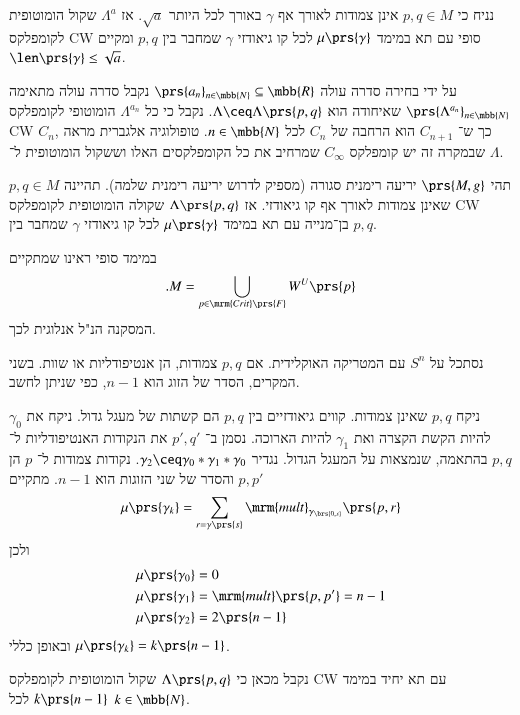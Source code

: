 \documentclass[a4paper,10pt,twoside,openany]{book}
\begin{document}
\begin{proposition}
נניח כי
$p,q \in M$
אינן צמודות לאורך אף
$\gamma$
באורך לכל היותר
$\sqrt{a}$.
אז
$\Lambda^a$
שקול הומוטופית לקומפלקס
\textenglish{CW}
סופי עם תא במימד
$\mu\prs{\gamma}$
לכל קו גיאודזי
$\gamma$
שמחבר בין
$p,q$
ומקיים
$\len\prs{\gamma} \leq \sqrt{a}$.
\end{proposition}

\begin{remark}
על ידי בחירה סדרה עולה
$\prs{a_n}_{n \in \mbb{N}} \subseteq \mbb{R}$
נקבל סדרה עולה מתאימה
$\prs{\Lambda^{a_n}}_{n \in \mbb{N}}$
שאיחודה הוא
$\Lambda \ceq \Lambda\prs{p,q}$.
נקבל כי כל
$\Lambda^{a_n}$
הומוטופי לקומפלקס
\textenglish{CW}
$C_n$,
כך ש־%
$C_{n+1}$
הוא הרחבה של
$C_n$
לכל
$n \in \mbb{N}$.
טופולוגיה אלגברית מראה שבמקרה זה יש קומפלקס
$C_\infty$
שמרחיב את כל הקומפלקסים האלו וששקול הומוטופית ל־%
$\Lambda$.
\end{remark}

\begin{corollary}
תהי
$\prs{M,g}$
יריעה רימנית סגורה (מספיק לדרוש יריעה רימנית שלמה).
תהיינה
$p,q \in M$
שאינן צמודות לאורך אף קו גיאודזי. אז
$\Lambda\prs{p,q}$
שקולה הומוטופית לקומפלקס
\textenglish{CW}
בן־מנייה עם תא במימד
$\mu\prs{\gamma}$
לכל קו גיאודזי
$\gamma$
שמחבר בין
$p,q$.
\end{corollary}

\begin{remark}
במימד סופי ראינו שמתקיים
\[\text{.} M = \bigcup_{p \in \mrm{Crit}\prs{F}} W^U\prs{p}\]
המסקנה הנ"ל אנלוגית לכך.
\end{remark}

\begin{example}
נסתכל על
$S^n$
עם המטריקה האוקלידית.
אם
$p,q$
צמודות, הן אנטיפודליות או שוות.
בשני המקרים, הסדר של הזוג הוא
$n-1$,
כפי שניתן לחשב.

ניקח
$p,q$
שאינן צמודות.
קווים גיאודזיים בין
$p,q$
הם קשתות של מעגל גדול. ניקח את
$\gamma_0$
להיות הקשת הקצרה ואת
$\gamma_1$
להיות הארוכה.
נסמן ב־%
$p', q'$
את הנקודות האנטיפודליות ל־%
$p,q$
בהתאמה, שנמצאות על המעגל הגדול.
נגדיר
$\gamma_2 \ceq \gamma_0 * \gamma_1 * \gamma_0$.
נקודות צמודות ל־%
$p$
הן
$p, p'$
והסדר של שני הזוגות הוא
$n-1$.
מתקיים
\begin{align*}
\mu\prs{\gamma_k} = \sum_{r = \gamma\prs{s}} \mrm{mult}_{\gamma_{\brs{0,s}}}\prs{p,r}
\end{align*}
ולכן
\begin{align*}
\mu\prs{\gamma_0} &= 0 \\
\mu\prs{\gamma_1} &= \mrm{mult}\prs{p,p'} = n- 1 \\
\mu\prs{\gamma_2} &= 2 \prs{n-1}
\end{align*}
ובאופן כללי
$\mu\prs{\gamma_k} = k\prs{n-1}$.

נקבל מכאן כי
$\Lambda\prs{p,q}$
שקול הומוטופית לקומפלקס
\textenglish{CW}
עם תא יחיד במימד
$k\prs{n-1}$
לכל
$k \in \mbb{N}$.
\end{example}
\end{document}
